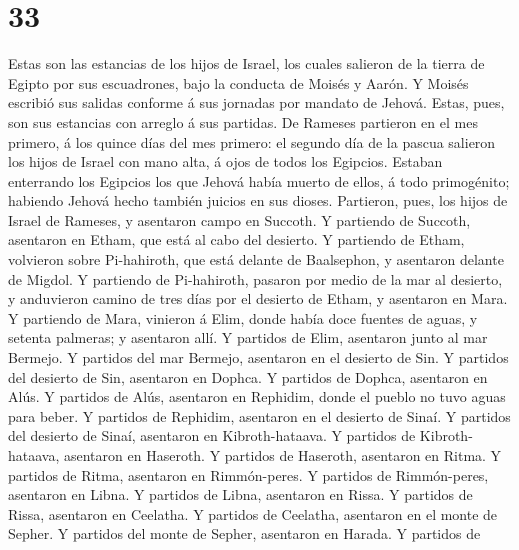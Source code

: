 \hypertarget{section-32}{%
\section{33}\label{section-32}}

 Estas son las estancias de los hijos de Israel, los
cuales salieron de la tierra de Egipto por sus escuadrones, bajo la
conducta de Moisés y Aarón.  Y Moisés escribió sus salidas
conforme á sus jornadas por mandato de Jehová. Estas, pues, son sus
estancias con arreglo á sus partidas.  De Rameses
partieron en el mes primero, á los quince días del mes primero: el
segundo día de la pascua salieron los hijos de Israel con mano alta, á
ojos de todos los Egipcios.  Estaban enterrando los
Egipcios los que Jehová había muerto de ellos, á todo primogénito;
habiendo Jehová hecho también juicios en sus dioses. 
Partieron, pues, los hijos de Israel de Rameses, y asentaron campo en
Succoth.  Y partiendo de Succoth, asentaron en Etham, que
está al cabo del desierto.  Y partiendo de Etham,
volvieron sobre Pi-hahiroth, que está delante de Baalsephon, y asentaron
delante de Migdol.  Y partiendo de Pi-hahiroth, pasaron
por medio de la mar al desierto, y anduvieron camino de tres días por el
desierto de Etham, y asentaron en Mara.  Y partiendo de
Mara, vinieron á Elim, donde había doce fuentes de aguas, y setenta
palmeras; y asentaron allí.  Y partidos de Elim,
asentaron junto al mar Bermejo.  Y partidos del mar
Bermejo, asentaron en el desierto de Sin.  Y partidos del
desierto de Sin, asentaron en Dophca.  Y partidos de
Dophca, asentaron en Alús.  Y partidos de Alús, asentaron
en Rephidim, donde el pueblo no tuvo aguas para beber.  Y
partidos de Rephidim, asentaron en el desierto de Sinaí. 
Y partidos del desierto de Sinaí, asentaron en Kibroth-hataava.
 Y partidos de Kibroth-hataava, asentaron en Haseroth.
 Y partidos de Haseroth, asentaron en Ritma.
 Y partidos de Ritma, asentaron en Rimmón-peres.
 Y partidos de Rimmón-peres, asentaron en Libna.
 Y partidos de Libna, asentaron en Rissa. 
Y partidos de Rissa, asentaron en Ceelatha.  Y partidos
de Ceelatha, asentaron en el monte de Sepher.  Y partidos
del monte de Sepher, asentaron en Harada.  Y partidos de
